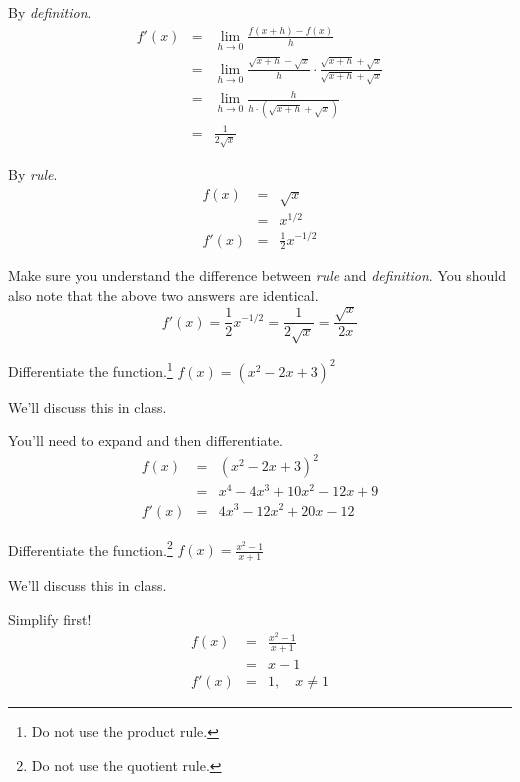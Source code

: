 \documentclass[12pt,addpoints, answers, fleqn]{exam}
\begin{document}
\begin{questions}
\begin{solution}
By \emph{definition}.
\begin{eqnarray*}
f' \left( x \right) &=& \lim_{h \to 0 }  \frac{f \left( x+h \right) - f \left( x \right)}{h}\\
&=& \lim_{h \to 0 }  \frac{ \sqrt{x+h} -  \sqrt{x}}{h} \cdot \frac{\sqrt{x+h} +  \sqrt{x}}{\sqrt{x+h} +  \sqrt{x}}\\
&=& \lim_{h \to 0 }  \frac{h}{h \cdot \left( \sqrt{x+h} +  \sqrt{x} \right)} \\
&=& \frac{1}{2\sqrt{x}}
\end{eqnarray*}

By \emph{rule}.
\begin{eqnarray*}
 f \left( x \right) &=& \sqrt{x}\\
 &=& x^{1/2}\\
 f'\left( x \right) &=& \frac{1}{2}x^{-1/2}
\end{eqnarray*}

Make sure you understand the difference between \emph{rule} and \emph{definition}. You should also note that the above two answers are identical.
\[
 f'\left( x \right) = \frac{1}{2}x^{-1/2} =  \frac{1}{2\sqrt{x}} =  \frac{\sqrt{x}}{2x}
\]
\end{solution}


\question Differentiate the function.\footnote{Do not use the product rule.}
$ \displaystyle f \left( x \right) = \left( x^2 - 2x + 3\right)^2$

\begin{solution}
We'll discuss this in class.

You'll need to expand and then differentiate.
\begin{eqnarray*}
 f \left( x \right) &=& \left( x^2 - 2x + 3\right)^2\\
 &=& x^4 -4x^3+10x^2-12x+9\\
  f' \left( x \right) &=& 4x^3 -12x^2+20x-12
\end{eqnarray*}

\end{solution}


\question Differentiate the function.\footnote{Do not use the quotient rule.}
$ \displaystyle f \left( x \right) = \frac{x^2-1}{x+1}$

\begin{solution}
We'll discuss this in class.

Simplify first!
\begin{eqnarray*}
 f \left( x \right) &=& \frac{x^2-1}{x+1}\\
 &=& x-1\\
  f' \left( x \right) &=& 1, \quad x \neq 1
\end{eqnarray*}


\end{solution}
\end{questions}
\end{document}
